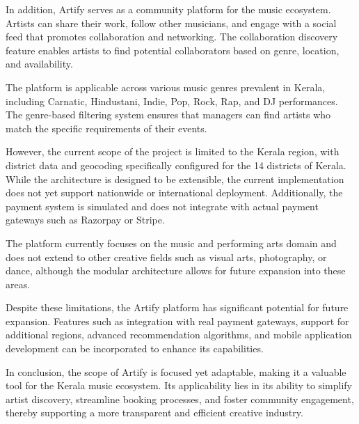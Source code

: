 \documentclass[12pt,a4paper]{report}
\begin{document}
In addition, Artify serves as a community platform for the music ecosystem. Artists can share their work, follow other musicians, and engage with a social feed that promotes collaboration and networking. The collaboration discovery feature enables artists to find potential collaborators based on genre, location, and availability.

The platform is applicable across various music genres prevalent in Kerala, including Carnatic, Hindustani, Indie, Pop, Rock, Rap, and DJ performances. The genre-based filtering system ensures that managers can find artists who match the specific requirements of their events.

However, the current scope of the project is limited to the Kerala region, with district data and geocoding specifically configured for the 14 districts of Kerala. While the architecture is designed to be extensible, the current implementation does not yet support nationwide or international deployment. Additionally, the payment system is simulated and does not integrate with actual payment gateways such as Razorpay or Stripe.

The platform currently focuses on the music and performing arts domain and does not extend to other creative fields such as visual arts, photography, or dance, although the modular architecture allows for future expansion into these areas.

Despite these limitations, the Artify platform has significant potential for future expansion. Features such as integration with real payment gateways, support for additional regions, advanced recommendation algorithms, and mobile application development can be incorporated to enhance its capabilities.

In conclusion, the scope of Artify is focused yet adaptable, making it a valuable tool for the Kerala music ecosystem. Its applicability lies in its ability to simplify artist discovery, streamline booking processes, and foster community engagement, thereby supporting a more transparent and efficient creative industry.

\setcounter{chapter}{2}
\clearpage
\thispagestyle{empty}

\noindent
{}
\end{document}
